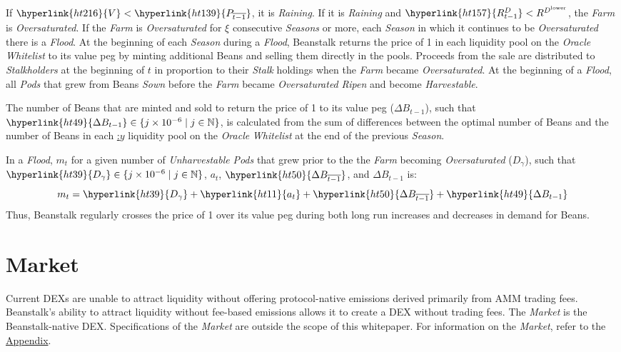 \documentclass[tikz]{article}
\newcommand{\term}[1]{\textsl{#1}}
\newcommand{\Bean}{} %
\begin{document}
If $\hyperlink{ht216}{V} < \hyperlink{ht139}{P_{\overline{t-1}}}$, it is \term{Raining}. If it is \term{Raining} and $\hyperlink{ht157}{R^D_{t-1}} < R^{D^{\text{lower}}}$, the \term{Farm} is \term{Oversaturated}. If the \term{Farm} is \term{Oversaturated} for \hyperlink{ht1}{$\xi$} consecutive \term{Seasons} or more, each \term{Season} in which it continues to be \term{Oversaturated} there is a \term{Flood}. At the beginning of each \term{Season} during a \term{Flood}, Beanstalk returns the price of \Bean1 in each liquidity pool on the \term{Oracle} \term{Whitelist} to its value peg by minting additional Beans and selling them directly in the pools. Proceeds from the sale are distributed to \term{Stalkholders} at the beginning of \hyperlink{ht204}{$t$} in proportion to their \term{Stalk} holdings when the \term{Farm} became \term{Oversaturated}. At the beginning of a \term{Flood}, all \term{Pods} that grew from Beans \term{Sown} before the \term{Farm} became \term{Oversaturated} \term{Ripen} and become \term{Harvestable}.

The number of Beans that are minted and sold to return the price of \Bean1 to its value peg (\hyperlink{ht49}{$\Delta B_{t-1}$}), such that $\hyperlink{ht49}{\Delta B_{t-1}} \in \{j \times 10^{-6} \mid j \in \mathbb{N} \}$, is calculated from the sum of differences between the optimal number of Beans and the number of Beans in each \hyperlink{ht6}{\Bean:$y$} liquidity pool on the \term{Oracle} \term{Whitelist} at the end of the previous \term{Season}.

In a \term{Flood}, $m_t$ for a given number of \term{Unharvestable} \term{Pods} that grew prior to the the \term{Farm} becoming \term{Oversaturated} (\hyperlink{ht39}{$D_{\gamma}$}), such that $\hyperlink{ht39}{D_{\gamma}} \in \{j \times 10^{-6} \mid j \in \mathbb{N} \}$, \hyperlink{ht11}{$a_t$}, $\hyperlink{ht50}{\Delta B_{\overline{t-1}}}$, and \hyperlink{ht49}{$\Delta B_{t-1}$} is:
$$m_t = \hyperlink{ht39}{D_{\gamma}} + \hyperlink{ht11}{a_t} + \hyperlink{ht50}{\Delta B_{\overline{t-1}}} + \hyperlink{ht49}{\Delta B_{t-1}}$$
Thus, Beanstalk regularly crosses the price of \Bean1 over its value peg during both long run increases and decreases in demand for Beans.

\section{Market}
Current DEXs are unable to attract liquidity without offering protocol-native emissions derived primarily from AMM trading fees. Beanstalk's ability to attract liquidity without fee-based emissions allows it to create a DEX without trading fees. The \term{Market} is the Beanstalk-native DEX. Specifications of the \term{Market} are outside the scope of this whitepaper. For information on the \term{Market}, refer to the \hyperlink{section.14}{Appendix}.
\end{document}
